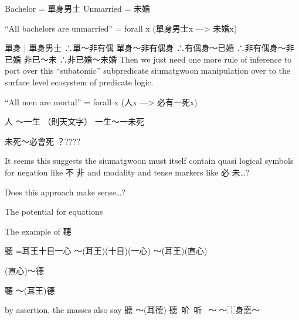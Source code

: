Bachelor = 單身男士
Unmarried = 未婚

“All bachelors are unmarried” = forall x (單身男士x —> 未婚x) 

單身 | 單身男士
∴單～非有偶
單身～非有偶身
∴有偶身～已婚
∴非有偶身～非已婚
非已～未
∴非已婚～未婚
Then we just need one more rule of inference to port over this “subatomic” subpredicate siumatgwoon manipulation over to the surface level ecosystem of predicate logic. 

“All men are mortal” = forall x (人x —> 必有一死x) 

人 ～一生 （則天文字）
一生～一未死

未死～必會死
？????

It seems this suggests the siumatgwoon must itself contain quasi logical symbols for negation like 不 非 and modality and tense markers like 必 未…?

Does this approach make sense…?


The potential for equations 

The example of 聽

聽 =耳王十目一心
～(耳王)(十目)(一心)
～(耳王)(直心)

(直心)～德

聽 ～(耳王)德

by assertion, the masses also say 
聽 ～(耳德)
聽~吤~听~𠯸～𪢧～⿰身𢛳～𦕘

